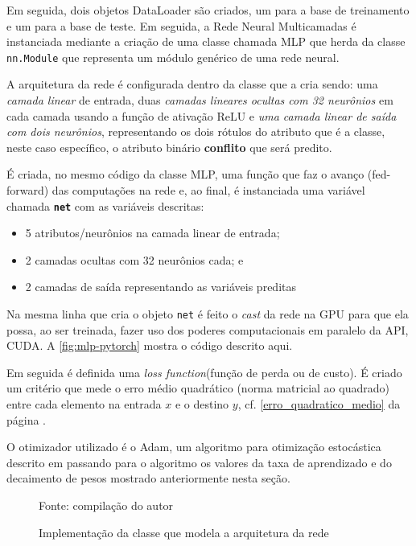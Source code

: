 Em seguida, dois objetos DataLoader são criados, um para a base de treinamento e um para a base de teste. Em seguida, a Rede Neural Multicamadas é instanciada mediante a criação de uma classe chamada MLP que herda da classe \texttt{nn.Module} que representa um módulo genérico de uma rede neural. 

A arquitetura da rede é configurada dentro da classe que a cria sendo: uma\textit{ camada linear} de entrada, duas \textit{camadas lineares ocultas com 32 neurônios} em cada camada usando a função de ativação ReLU e \textit{uma camada linear de saída com dois neurônios}, representando os dois rótulos do atributo que é a classe, neste caso específico, o atributo binário \textbf{conflito} que será predito. 

É criada, no mesmo código da classe MLP, uma função que faz o avanço (fed-forward) das computações na rede e, ao final, é instanciada uma variável chamada \texttt{\textbf{net}} com as variáveis descritas: 
\begin{itemize}
	\item 5 atributos/neurônios na camada linear de entrada;
	\item 2 camadas ocultas com 32 neurônios cada; e
	\item 2 camadas de saída representando as variáveis preditas
\end{itemize}

Na mesma linha que cria o objeto \texttt{net} é feito o \textit{cast} da rede na GPU para que ela possa, ao ser treinada, fazer uso dos poderes computacionais em paralelo da API, CUDA. A \autoref{fig:mlp-pytorch} mostra o código descrito aqui.

Em seguida é definida uma \textit{loss function}(função de perda ou de custo). É criado um critério que mede o erro médio quadrático (norma matricial ao quadrado) entre cada elemento na entrada $x$ e o destino $y$, cf. \autoref{erro_quadratico_medio} da página . 

O otimizador utilizado é o Adam, um algoritmo para otimização estocástica descrito em  passando para o algoritmo os valores da taxa de aprendizado e do decaimento de pesos mostrado anteriormente nesta seção.

\begin{figure}[H]
	\centering
	\caption{Implementação da classe que modela a arquitetura da rede}
	
	\label{fig:mlp-pytorch}
	{\scriptsize Fonte: compilação do autor}
\end{figure}

